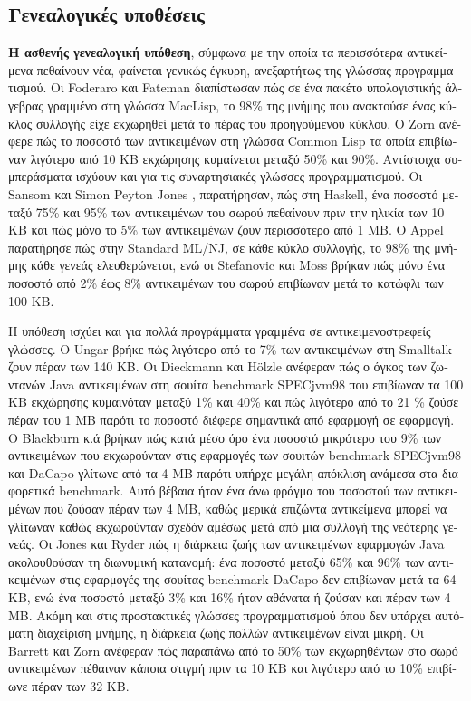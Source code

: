 \begin{greek}
\section{Γενεαλογικές υποθέσεις}
\textbf{H ασθενής γενεαλογική υπόθεση}, σύμφωνα με την οποία
τα περισσότερα αντικείμενα πεθαίνουν νέα, φαίνεται γενικώς
έγκυρη, ανεξαρτήτως της γλώσσας προγραμματισμού. Οι Foderaro
και Fateman \cite{DBLP:conf/issac/FoderaroF81} διαπίστωσαν
πώς σε ένα πακέτο υπολογιστικής άλγεβρας γραμμένο στη γλώσσα
MacLisp, το 98\% της μνήμης που ανακτούσε ένας κύκλος συλλογής
είχε εκχωρηθεί μετά το πέρας του προηγούμενου κύκλου. Ο Zorn
\cite{Zorn:CSD-89-544} ανέφερε πώς το ποσοστό των αντικειμένων
στη γλώσσα Common Lisp τα οποία επιβίωναν λιγότερο από 10 ΚΒ
εκχώρησης κυμαίνεται μεταξύ 50\% και 90\%. Αντίστοιχα συμπεράσματα 
ισχύουν και για τις συναρτησιακές γλώσσες προγραμματισμού. Οι
Sansom και Simon Peyton Jones \cite{DBLP:conf/fpca/SansomJ93},
παρατήρησαν, πώς στη Haskell, ένα ποσοστό μεταξύ 75\% και 95\%
των αντικειμένων του σωρού πεθαίνουν πριν την ηλικία των 10 KB
και πώς μόνο το 5\% των αντικειμένων ζουν περισσότερο από 1 ΜΒ.
Ο Appel παρατήρησε πώς στην Standard ML/NJ, σε κάθε κύκλο
συλλογής, το 98\% της μνήμης κάθε γενεάς ελευθερώνεται, ενώ
οι Stefanovic και Moss \cite{DBLP:conf/lfp/StefanovicM94}
βρήκαν πώς μόνο ένα ποσοστό από 2\% έως 8\% αντικειμένων του
σωρού επιβίωναν μετά το κατώφλι των 100 ΚΒ.

Η υπόθεση ισχύει και για πολλά προγράμματα γραμμένα σε
αντικειμενοστρεφείς γλώσσες. Ο Ungar \cite{Ungar:CSD-86-287}
βρήκε πώς λιγότερο από το 7\% των αντικειμένων στη Smalltalk
ζουν πέραν των 140 KB. Οι Dieckmann και H{\"o}lzle
\cite{DBLP:conf/ecoop/DieckmannH99} ανέφεραν πώς ο όγκος των
ζωντανών Java αντικειμένων στη σουίτα benchmark SPECjvm98
που επιβίωναν τα 100 KB εκχώρησης κυμαινόταν μεταξύ 1\%
και 40\% και πώς λιγότερο από το 21 \% ζούσε πέραν του 1 ΜΒ
παρότι το ποσοστό διέφερε σημαντικά από εφαρμογή σε εφαρμογή.
Ο Blackburn κ.ά \cite{DBLP:conf/oopsla/BlackburnGHKMBDFFGHHJLMPSVDW06}
βρήκαν πώς κατά μέσο όρο ένα ποσοστό μικρότερο του 9\% των
αντικειμένων που εκχωρούνταν στις εφαρμογές των σουιτών
benchmark SPECjvm98 και DaCapo γλίτωνε από τα 4 MB παρότι
υπήρχε μεγάλη απόκλιση ανάμεσα στα διαφορετικά benchmark.
Αυτό βέβαια ήταν ένα άνω φράγμα του ποσοστού των αντικειμένων
που ζούσαν πέραν των 4 MB, καθώς μερικά επιζώντα αντικείμενα
μπορεί να γλίτωναν καθώς εκχωρούνταν σχεδόν αμέσως μετά από
μια συλλογή της νεότερης γενεάς. Οι Jones και Ryder \cite{DBLP:conf/iwmm/JonesR08}
πώς η διάρκεια ζωής των αντικειμένων εφαρμογών Java ακολουθούσαν
τη διωνυμική κατανομή: ένα ποσοστό μεταξύ 65\% και 96\% των
αντικειμένων στις εφαρμογές της σουίτας benchmark DaCapo
δεν επιβίωναν μετά τα 64 KB, ενώ ένα ποσοστό μεταξύ 3\%
και 16\% ήταν αθάνατα ή ζούσαν και πέραν των 4 MB. Ακόμη
και στις προστακτικές γλώσσες προγραμματισμού όπου δεν υπάρχει
αυτόματη διαχείριση μνήμης, η διάρκεια ζωής πολλών αντικειμένων
είναι μικρή. Οι Barrett και Zorn \cite{DBLP:conf/pldi/BarrettZ93}
ανέφεραν πώς παραπάνω από το 50\% των εκχωρηθέντων στο σωρό
αντικειμένων πέθαιναν κάποια στιγμή πριν τα 10 KB και λιγότερο
από το 10\% επιβίωνε πέραν των 32 KB.


\end{greek}
